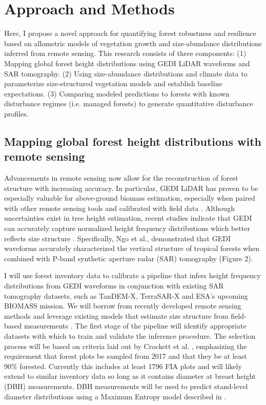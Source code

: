\section{Approach and Methods}

Here, I propose a novel approach for quantifying forest robustness and resilience based on allometric models of vegetation growth and size-abundance distributions inferred from remote sensing. This research consists of three components: (1) Mapping global forest height distributions using GEDI LiDAR waveforms and SAR tomography. (2) Using size-abundance distributions and climate data to parameterize size-structured vegetation models and establish baseline expectations. (3) Comparing modeled predictions to forests with known disturbance regimes (i.e. managed forests) to generate quantitative disturbance profiles. 

\subsection{Mapping global forest height distributions with remote sensing}

Advancements in remote sensing now allow for the reconstruction of forest structure with increasing accuracy. In particular, GEDI LiDAR has proven to be especially valuable for above-ground biomass estimation, especially when paired with other remote sensing tools and calibrated with field data \cite{chi_national_2015, crockett_structural_2023, potapov_mapping_2021}. Although uncertainties exist in tree height estimation, recent studies indicate that GEDI can accurately capture normalized height frequency distributions which better reflects size structure \cite{tan_exploring_2024}. Specifically, Ngo et al., \cite{ngo_tropical_2022} demonstrated that GEDI waveforms accurately characterized the vertical structure of tropical forests when combined with P-band synthetic aperture radar (SAR) tomography (Figure 2).

I will use forest inventory data to calibrate a pipeline that infers height frequency distributions from GEDI waveforms in conjunction with existing SAR tomography datasets, such as TanDEM-X, TerraSAR-X and ESA’s upcoming BIOMASS mission. We will borrow from recently developed remote sensing methods and leverage existing models that estimate size structure from field-based measurements \cite{ngo_tropical_2022, ramachandran_evaluation_2021}. 
The first stage of the pipeline will identify appropriate datasets with which to train and validate the inference procedure. The selection process will be based on criteria laid out by Crockett et al. \cite{crockett_structural_2023}, emphasizing the requirement that forest plots be sampled from 2017 and that they be at least 90\% forested. Currently this includes at least 1796 FIA plots and will likely extend to similar inventory data so long as it contains diameter at breast height (DBH) measurements. DBH measurements will be used to predict stand-level diameter distributions using a Maximum Entropy model described in \cite{chen_stand_2019}.

